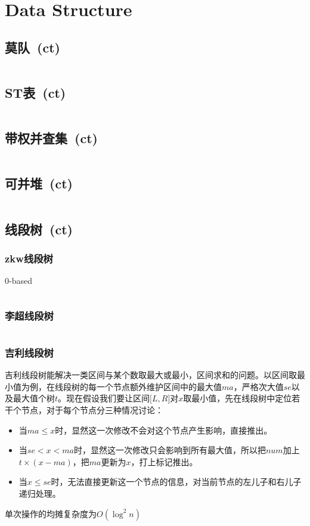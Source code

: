 \chapter{Data Structure}
\section{莫队\ \small(ct)}
	\inputminted{cpp}{data_structure/mo_dui.cpp}
\section{ST表\ \small(ct)}
	\inputminted{cpp}{data_structure/st_table.cpp}
\section{带权并查集\ \small(ct)}
	\inputminted{cpp}{data_structure/union_find_weighted.cpp}
\section{可并堆\ \small(ct)}
	\inputminted{cpp}{data_structure/mergeable_heap.cpp}
\section{线段树\ \small(ct)}
	\subsection*{zkw线段树}
		$ 0 $-based
		\inputminted{cpp}{data_structure/zkw_segment_tree.cpp}
	\subsection*{李超线段树}
		\inputminted{cpp}{data_structure/li_chao_segment_tree.cpp}
	\subsection*{吉利线段树}
		吉利线段树能解决一类区间与某个数取最大或最小，区间求和的问题。以区间取最小值为例，在线段树的每一个节点额外维护区间中的最大值$ ma $，严格次大值$ se $以及最大值个树$ t $。现在假设我们要让区间$ \lbrack L, R \rbrack $对$ x $取最小值，先在线段树中定位若干个节点，对于每个节点分三种情况讨论：
		\begin{itemize}[nosep]
			\item 当$ ma \leq x $时，显然这一次修改不会对这个节点产生影响，直接推出。
			\item 当$ se < x < ma $时，显然这一次修改只会影响到所有最大值，所以把$ num $加上$ t \times (x - ma) $，把$ ma $更新为$ x $，打上标记推出。
			\item 当$ x \leq se $时，无法直接更新这一个节点的信息，对当前节点的左儿子和右儿子递归处理。
		\end{itemize}
		单次操作的均摊复杂度为$ O(\log^2 n) $
